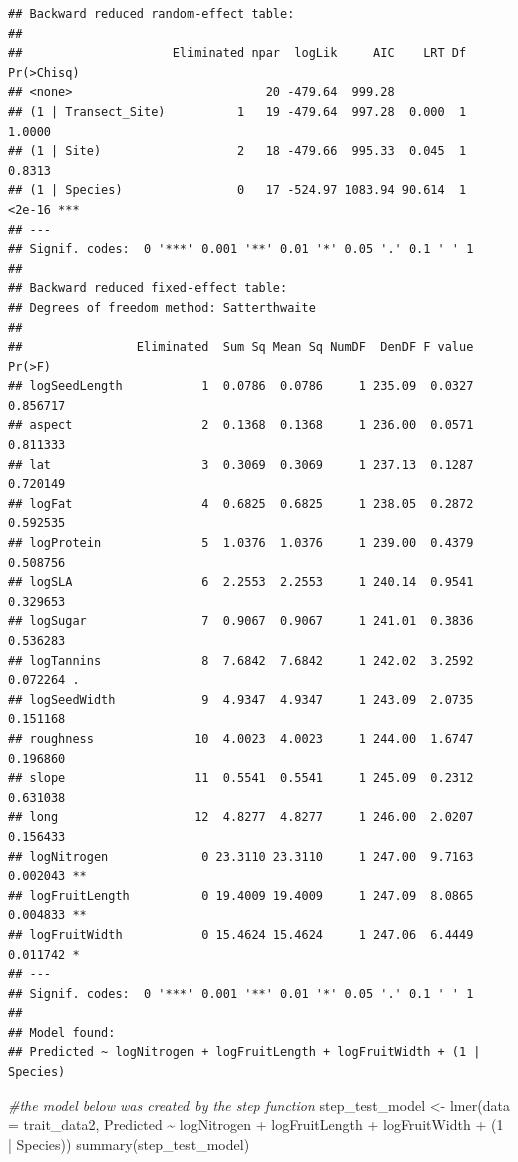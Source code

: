 \documentclass[
  12pt,
]{article}
\newenvironment{Shaded}{\begin{snugshade}}{\end{snugshade}}
\newcommand{\AttributeTok}[1]{\textcolor[rgb]{0.77,0.63,0.00}{#1}}
\newcommand{\CommentTok}[1]{\textcolor[rgb]{0.56,0.35,0.01}{\textit{#1}}}
\newcommand{\DecValTok}[1]{\textcolor[rgb]{0.00,0.00,0.81}{#1}}
\newcommand{\FunctionTok}[1]{\textcolor[rgb]{0.00,0.00,0.00}{#1}}
\newcommand{\NormalTok}[1]{#1}
\newcommand{\OtherTok}[1]{\textcolor[rgb]{0.56,0.35,0.01}{#1}}
\newcommand{\SpecialCharTok}[1]{\textcolor[rgb]{0.00,0.00,0.00}{#1}}
\begin{document}
\begin{verbatim}
## Backward reduced random-effect table:
## 
##                     Eliminated npar  logLik     AIC    LRT Df Pr(>Chisq)    
## <none>                           20 -479.64  999.28                         
## (1 | Transect_Site)          1   19 -479.64  997.28  0.000  1     1.0000    
## (1 | Site)                   2   18 -479.66  995.33  0.045  1     0.8313    
## (1 | Species)                0   17 -524.97 1083.94 90.614  1     <2e-16 ***
## ---
## Signif. codes:  0 '***' 0.001 '**' 0.01 '*' 0.05 '.' 0.1 ' ' 1
## 
## Backward reduced fixed-effect table:
## Degrees of freedom method: Satterthwaite 
## 
##                Eliminated  Sum Sq Mean Sq NumDF  DenDF F value   Pr(>F)   
## logSeedLength           1  0.0786  0.0786     1 235.09  0.0327 0.856717   
## aspect                  2  0.1368  0.1368     1 236.00  0.0571 0.811333   
## lat                     3  0.3069  0.3069     1 237.13  0.1287 0.720149   
## logFat                  4  0.6825  0.6825     1 238.05  0.2872 0.592535   
## logProtein              5  1.0376  1.0376     1 239.00  0.4379 0.508756   
## logSLA                  6  2.2553  2.2553     1 240.14  0.9541 0.329653   
## logSugar                7  0.9067  0.9067     1 241.01  0.3836 0.536283   
## logTannins              8  7.6842  7.6842     1 242.02  3.2592 0.072264 . 
## logSeedWidth            9  4.9347  4.9347     1 243.09  2.0735 0.151168   
## roughness              10  4.0023  4.0023     1 244.00  1.6747 0.196860   
## slope                  11  0.5541  0.5541     1 245.09  0.2312 0.631038   
## long                   12  4.8277  4.8277     1 246.00  2.0207 0.156433   
## logNitrogen             0 23.3110 23.3110     1 247.00  9.7163 0.002043 **
## logFruitLength          0 19.4009 19.4009     1 247.09  8.0865 0.004833 **
## logFruitWidth           0 15.4624 15.4624     1 247.06  6.4449 0.011742 * 
## ---
## Signif. codes:  0 '***' 0.001 '**' 0.01 '*' 0.05 '.' 0.1 ' ' 1
## 
## Model found:
## Predicted ~ logNitrogen + logFruitLength + logFruitWidth + (1 | Species)
\end{verbatim}

\begin{Shaded}
\begin{Highlighting}[]
\CommentTok{\#the model below was created by the step function}
\NormalTok{step\_test\_model }\OtherTok{\textless{}{-}} \FunctionTok{lmer}\NormalTok{(}\AttributeTok{data =}\NormalTok{ trait\_data2, Predicted }\SpecialCharTok{\textasciitilde{}}\NormalTok{ logNitrogen }\SpecialCharTok{+}\NormalTok{ logFruitLength }\SpecialCharTok{+}\NormalTok{ logFruitWidth }\SpecialCharTok{+}\NormalTok{ (}\DecValTok{1} \SpecialCharTok{|}\NormalTok{ Species))}
\FunctionTok{summary}\NormalTok{(step\_test\_model)}
\end{Highlighting}
\end{Shaded}
\end{document}
